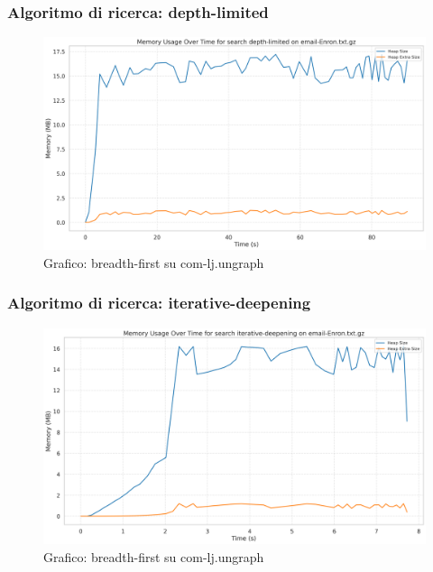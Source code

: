 \documentclass{article}
\begin{document}
\subsubsection{Algoritmo di ricerca: depth-limited}
\begin{figure}[h]\centering
	\includegraphics[width=\textwidth]{../plots/email-Enron_depth-limited.png}
	\caption{Grafico: breadth-first su com-lj.ungraph}
\end{figure}
\subsubsection{Algoritmo di ricerca: iterative-deepening}
\begin{figure}[h]\centering
	\includegraphics[width=\textwidth]{../plots/email-Enron_iterative-deepening.png}
	\caption{Grafico: breadth-first su com-lj.ungraph}
\end{figure}
\end{document}
